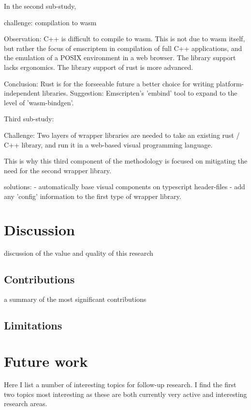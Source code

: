 In the second sub-study,

challenge: 
compilation to wasm

Observation: 
C++ is difficult to compile to wasm.
This is not due to wasm itself, but rather the focus of emscriptem in compilation of full C++ applications, and the emulation of a POSIX environment in a web browser. 
The library support lacks ergonomics.
The library support of rust is more advanced.

Conclusion: 
Rust is for the forseeable future a better choice for writing platform-independent libraries. 
Suggestion: Emscripten's 'embind' tool to expand to the level of 'wasm-bindgen'.

Third sub-study: 

Challenge:
Two layers of wrapper libraries are needed to take an existing rust / C++ library, and run it in a web-based visual programming language.

This is why this third component of the methodology is focused on mitigating the need for the second wrapper library. 

solutions: 
- automatically base visual components on typescript header-files
- add any 'config' information to the first type of wrapper library. 


\section{Discussion}
\label{sec:discussion}

discussion of the value and quality of this research

\subsection{Contributions}
\label{sec:contribution}

a summary of the most significant contributions


\subsection{Limitations}
\label{sec:limitations}

\section{Future work}
\label{sec:future-work}

Here I list a number of interesting topics for follow-up research. 
I find the first two topics most interesting as these are both currently very active and interesting research areas.

